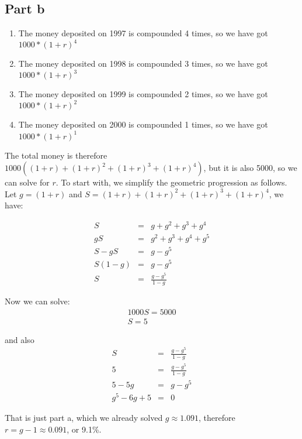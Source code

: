 \subsection*{Part b}
\begin{enumerate}
  \item{The money deposited on 1997 is compounded 4 times, so we have got $ 1000 * (1+r)^4 $}
  \item{The money deposited on 1998 is compounded 3 times, so we have got $ 1000 * (1+r)^3 $}
  \item{The money deposited on 1999 is compounded 2 times, so we have got $ 1000 * (1+r)^2 $}
  \item{The money deposited on 2000 is compounded 1 times, so we have got $ 1000 * (1+r)^1 $}
\end{enumerate}
The total money is therefore $ 1000 ((1 + r) + (1 + r)^2 + (1 + r)^3 + (1 + r)^4) $, but it is also 5000, so we can solve for $ r $. To start with, we simplify the geometric progression as follows. Let $ g = (1+r) $ and $ S = (1 + r) + (1 + r)^2 + (1 + r)^3 + (1 + r)^4 $, we have:

\begin{eqnarray*}
         S &=& g + g^2 + g^3 + g^4   \\
        gS &=& g^2 + g^3 + g^4 + g^5 \\
    S - gS &=& g - g^5               \\
  S(1 - g) &=& g - g^5               \\
         S &=& \frac{g - g^5}{1 - g}
\end{eqnarray*}

Now we can solve:
\begin{eqnarray*}
  1000S = 5000 \\
  S = 5
\end{eqnarray*}

and also
\begin{eqnarray*}
            S &=& \frac{g - g^5}{1 - g} \\
            5 &=& \frac{g - g^5}{1 - g} \\
       5 - 5g &=& g - g^5 \\
  g^5 -6g + 5 &=& 0
\end{eqnarray*}

That is just part a, which we already solved $ g \approx 1.091 $, therefore $ r = g - 1 \approx 0.091 $, or 9.1\%.

